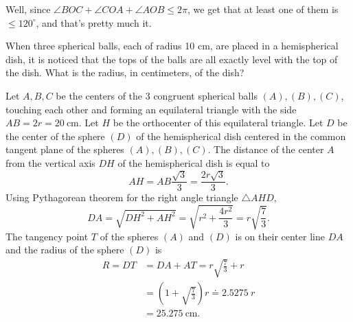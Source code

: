 \begin{solution}[name={Solution by Grobber}] 
	Well, since $\angle BOC+\angle COA+\angle AOB\le 2\pi$, we get that at least one of them is $\le 120^{\circ}$, and that's pretty much it.
\end{solution}




\begin{question}[name={1999 Australian Math Competition}]
	When three spherical balls, each of radius 10 cm, are placed in a hemispherical dish, it is noticed that the tops of the balls are all exactly level with the top of the dish. What is the radius, in centimeters, of the dish?
\end{question}



\begin{solution}[name={Solution by Yetti}] 
	Let $A, B, C$ be the centers of the 3 congruent spherical balls $(A), (B), (C)$, touching each other and forming an equilateral triangle with the side $AB = 2r = 20\ \text{cm}$. Let $H$ be the orthocenter of this equilateral triangle. Let $D$ be the center of the sphere $(D)$ of the hemispherical dish centered in the common tangent plane of the spheres $(A), (B), (C)$. The distance of the center $A$ from the vertical axis $DH$ of the hemispherical dish is equal to \[AH = AB \frac{\sqrt 3}{3} = \frac{2r \sqrt 3}{3}.\]
	Using Pythagorean theorem for the right angle triangle $\triangle AHD$,
	\[DA = \sqrt{DH^2 + AH^2} = \sqrt{r^2 + \frac{4r^2}{3}} = r \sqrt{\frac 7 3}.\]
	The tangency point $T$ of the spheres $(A)$ and  $(D)$ is on their center line $DA$ and the radius of the sphere $(D)$ is
	\begin{align*}
		R = DT &= DA + AT = r \sqrt{\frac 7 3} + r \\ 
		&= \left(1 + \sqrt{\frac 7 3}\right) r \doteq 2.5275\ r \\
		&= 25. 275\ \text{cm}.
	\end{align*}
\end{solution}




